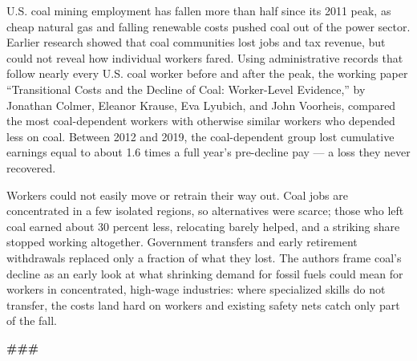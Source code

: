\documentclass[
  11pt,
]{article}
\begin{document}
\noindent U.S. coal mining employment has fallen more than half since its 2011 peak, as cheap natural gas and falling renewable costs pushed coal out of the power sector. Earlier research showed that coal communities lost jobs and tax revenue, but could not reveal how individual workers fared. Using administrative records that follow nearly every U.S. coal worker before and after the peak, the working paper ``Transitional Costs and the Decline of Coal: Worker-Level Evidence,'' by Jonathan Colmer, Eleanor Krause, Eva Lyubich, and John Voorheis, compared the most coal-dependent workers with otherwise similar workers who depended less on coal. Between 2012 and 2019, the coal-dependent group lost cumulative earnings equal to about 1.6 times a full year's pre-decline pay --- a loss they never recovered.

\vspace{6pt}
\noindent Workers could not easily move or retrain their way out. Coal jobs are concentrated in a few isolated regions, so alternatives were scarce; those who left coal earned about 30 percent less, relocating barely helped, and a striking share stopped working altogether. Government transfers and early retirement withdrawals replaced only a fraction of what they lost. The authors frame coal's decline as an early look at what shrinking demand for fossil fuels could mean for workers in concentrated, high-wage industries: where specialized skills do not transfer, the costs land hard on workers and existing safety nets catch only part of the fall.

\vspace{15pt}


\vspace{11pt}

\begin{center}{\color{faint}\bfseries \#\#\#}\end{center}
\end{document}
